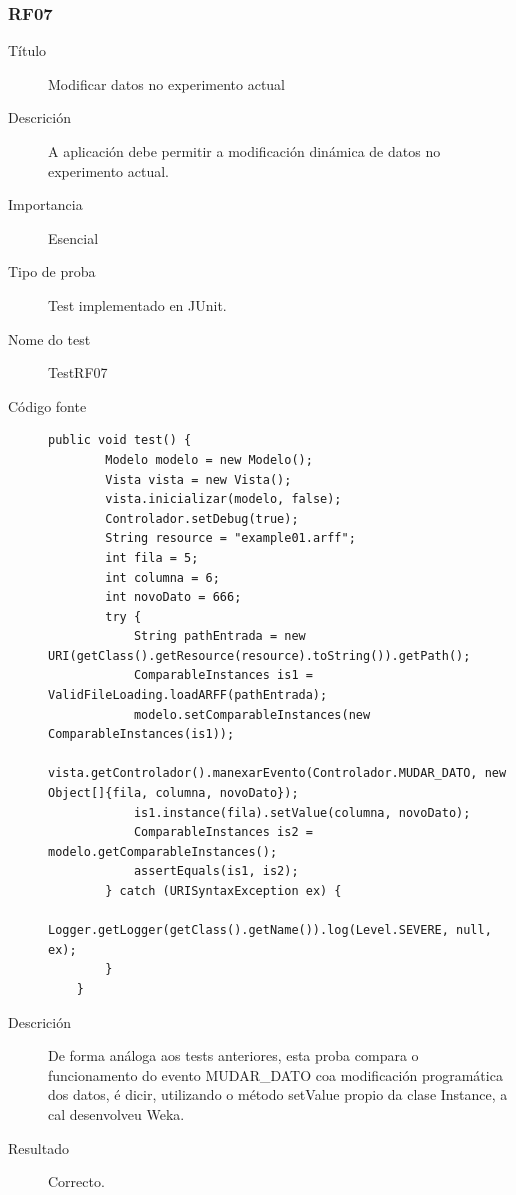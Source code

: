 \subsubsection*{RF07}
\begin{description}
\item[Título] \hfill
Modificar datos no experimento actual
\item[Descrición] \hfill
A aplicación debe permitir a modificación dinámica de datos no experimento actual.
\item[Importancia] \hfill
Esencial
\item[Tipo de proba] \hfill
Test implementado en JUnit.
\item[Nome do test] \hfill
TestRF07
\item[Código fonte]
\begin{lstlisting}
public void test() {
        Modelo modelo = new Modelo();
        Vista vista = new Vista();
        vista.inicializar(modelo, false);
        Controlador.setDebug(true);
        String resource = "example01.arff";
        int fila = 5;
        int columna = 6;
        int novoDato = 666;
        try {
            String pathEntrada = new URI(getClass().getResource(resource).toString()).getPath();
            ComparableInstances is1 = ValidFileLoading.loadARFF(pathEntrada);
            modelo.setComparableInstances(new ComparableInstances(is1));
            vista.getControlador().manexarEvento(Controlador.MUDAR_DATO, new Object[]{fila, columna, novoDato});
            is1.instance(fila).setValue(columna, novoDato);
            ComparableInstances is2 = modelo.getComparableInstances();
            assertEquals(is1, is2);
        } catch (URISyntaxException ex) {
            Logger.getLogger(getClass().getName()).log(Level.SEVERE, null, ex);
        }
    }
\end{lstlisting}
\item[Descrición]
De forma análoga aos tests anteriores, esta proba compara o funcionamento do evento MUDAR\_DATO coa modificación programática dos datos, é dicir, utilizando o método setValue propio da clase Instance, a cal desenvolveu Weka.
\item[Resultado]
Correcto.
\end{description}

